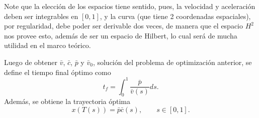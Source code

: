 \documentclass[a4paper,10pt]{book}
\newcommand{\R}{\mathbbm{R}}
\begin{document}
Note que la elección de los espacios tiene sentido, pues, la velocidad y aceleración deben ser integrables en $[0,1]$, y la curva (que tiene 2 coordenadas espaciales), por regularidad, debe poder ser derivable dos veces, de manera que el espacio $H^2$ nos provee esto, además de ser un espacio de Hilbert, lo cual será de mucha utilidad en el marco teórico.


Luego de obtener $\bar v$, $\bar c$, $\bar p$ y $\bar v_0$, solución del problema de optimización anterior, se define el tiempo final óptimo como
\[
 t_f=\int_{0}^{1} \frac{\bar p}{\bar v(s)}ds.
\]
Además, se obtiene la trayectoria óptima
\[
 x(T(s))=\bar p\bar c(s),\qquad s\in[0,1].
\]

% 
% 
% 
% 
% 
\end{document}
